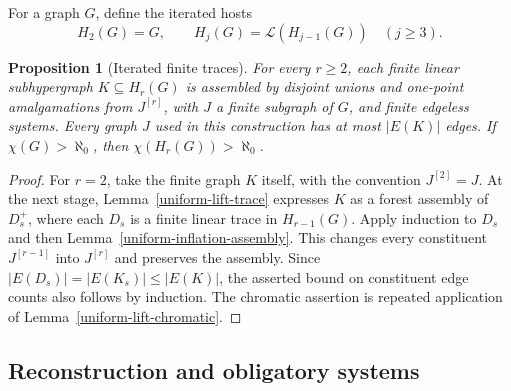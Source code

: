 \documentclass[a4paper,11pt,reqno]{amsart}
\theoremstyle{plain}
\newtheorem{proposition}[theorem]{Proposition}
\theoremstyle{definition}
\theoremstyle{remark}
\begin{document}
For a graph $G$, define the iterated hosts
\[
 H_2(G)=G,\qquad H_j(G)=\mathcal L(H_{j-1}(G))\quad(j\ge3).
\]

\begin{proposition}[Iterated finite traces]
\label{uniform-iterated-traces}
For every $r\ge2$, each finite linear subhypergraph $K\subseteq H_r(G)$
is assembled by disjoint unions and one-point amalgamations from
$J^{[r]}$, with $J$ a finite subgraph of $G$, and finite edgeless systems.
Every graph $J$ used in this construction has at most $|E(K)|$ edges.
If $\chi(G)>\aleph_0$, then $\chi(H_r(G))>\aleph_0$.
\end{proposition}
\begin{proof}
For $r=2$, take the finite graph $K$ itself, with the convention
$J^{[2]}=J$.  At the next stage,
Lemma~\ref{uniform-lift-trace} expresses $K$ as a forest assembly of
$D_s^+$, where each $D_s$ is a finite linear trace in $H_{r-1}(G)$.
Apply induction to $D_s$ and then Lemma~\ref{uniform-inflation-assembly}.
This changes every constituent $J^{[r-1]}$ into $J^{[r]}$ and preserves
the assembly.  Since $|E(D_s)|=|E(K_s)|\le|E(K)|$, the asserted bound on
constituent edge counts also follows by induction.  The chromatic assertion
is repeated application of Lemma~\ref{uniform-lift-chromatic}.
\end{proof}

\subsection{Reconstruction and obligatory systems}
\label{uniform-reconstruction}
\end{document}
